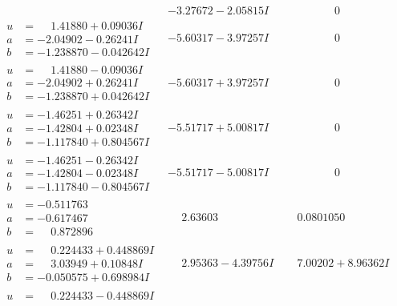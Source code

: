 \documentclass[1p]{elsarticle_modified}
\theoremstyle{definition}
\begin{document}
$$\begin{array}{c|c|c}
 & -3.27672 - 2.05815 I & \phantom{-0.000000 } 0 \\ \hline\begin{aligned}
u &= \phantom{-}1.41880 + 0.09036 I \\
a &= -2.04902 - 0.26241 I \\
b &= -1.238870 - 0.042642 I\end{aligned}
 & -5.60317 - 3.97257 I & \phantom{-0.000000 } 0 \\ \hline\begin{aligned}
u &= \phantom{-}1.41880 - 0.09036 I \\
a &= -2.04902 + 0.26241 I \\
b &= -1.238870 + 0.042642 I\end{aligned}
 & -5.60317 + 3.97257 I & \phantom{-0.000000 } 0 \\ \hline\begin{aligned}
u &= -1.46251 + 0.26342 I \\
a &= -1.42804 + 0.02348 I \\
b &= -1.117840 + 0.804567 I\end{aligned}
 & -5.51717 + 5.00817 I & \phantom{-0.000000 } 0 \\ \hline\begin{aligned}
u &= -1.46251 - 0.26342 I \\
a &= -1.42804 - 0.02348 I \\
b &= -1.117840 - 0.804567 I\end{aligned}
 & -5.51717 - 5.00817 I & \phantom{-0.000000 } 0 \\ \hline\begin{aligned}
u &= -0.511763\phantom{ +0.000000I} \\
a &= -0.617467\phantom{ +0.000000I} \\
b &= \phantom{-}0.872896\phantom{ +0.000000I}\end{aligned}
 & \phantom{-}2.63603\phantom{ +0.000000I} & \phantom{-}0.0801050\phantom{ +0.000000I} \\ \hline\begin{aligned}
u &= \phantom{-}0.224433 + 0.448869 I \\
a &= \phantom{-}3.03949 + 0.10848 I \\
b &= -0.050575 + 0.698984 I\end{aligned}
 & \phantom{-}2.95363 - 4.39756 I & \phantom{-}7.00202 + 8.96362 I \\ \hline\begin{aligned}
u &= \phantom{-}0.224433 - 0.448869 I \\

\end{aligned}
\end{array}$$
\end{document}
